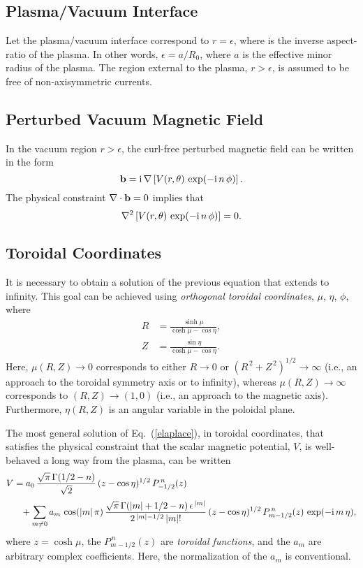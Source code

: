 \documentclass[12pt,prb,aps]{revtex4-1}
\begin{document}
\subsection{Plasma/Vacuum Interface}
Let the plasma/vacuum interface  correspond to $r=\epsilon$, where  is the inverse aspect-ratio of the
plasma. In other words, $\epsilon=a/R_0$, where $a$ is the effective minor radius of the plasma. 
The region external to the plasma, $r>\epsilon$, is assumed to be  free of non-axisymmetric currents.

\subsection{Perturbed Vacuum Magnetic Field}\label{pertb}
In the vacuum region $r>\epsilon$, the curl-free perturbed magnetic field can be written in the form\,\cite{am1}
\begin{equation}\label{vdef}
{\bf b} = {\rm i}\,\nabla\left[ V(r,\theta)\,\exp(-{\rm i}\,n\,\phi)\right].
\end{equation}
The physical constraint $\nabla\cdot {\bf b} =0$ implies that
\begin{equation}\label{elaplace}
\nabla^2 \left[V(r,\theta)\,\exp(-{\rm i}\,n\,\phi)\right]= 0.
\end{equation}

\subsection{Toroidal Coordinates}
It is necessary to obtain a solution of the previous equation that extends to infinity. This goal can be achieved using {\em orthogonal toroidal coordinates}, $\mu$, $\eta$, $\phi$, 
where\,\cite{morse}
\begin{align}\label{e54cx}
R &= \frac{\sinh\mu}{\cosh\mu-\cos\eta},\\[0.5ex]
Z&= \frac{\sin\eta}{\cosh\mu-\cos\eta}.\label{e55cc}
\end{align}
Here, $\mu(R,Z)\rightarrow 0$ corresponds to either $R\rightarrow 0$ or $(R^{\,2}+Z^{\,2})^{1/2}\rightarrow\infty$ (i.e.,
an approach to the toroidal symmetry axis or to infinity), whereas $\mu(R,Z)\rightarrow \infty$
corresponds to $(R, Z) \rightarrow (1, 0)$ (i.e., an approach to the magnetic axis). Furthermore, $\eta(R,Z)$ is an angular variable in the poloidal
plane. 

 The most general solution of Eq.~(\ref{elaplace}), in toroidal coordinates, that satisfies the physical constraint that the scalar magnetic
 potential, $V$,    is well-behaved a long way from the plasma, can be written\,\cite{morse1}
\begin{align}\label{e233}
V &=
 a_0\,\frac{\sqrt{\pi}\,\Gamma(1/2-n)}{\sqrt{2}}\,(z-\cos\eta)^{1/2}\,P_{-1/2}^{\,n}(z) \\[0.5ex]
&\phantom{=}+\sum_{m\neq 0} a_m\,\cos(|m|\,\pi)\,
\frac{\sqrt{\pi}\,\Gamma(|m|+1/2-n)\,\epsilon^{\,|m|}}{2^{\,|m|-1/2}\,|m|!}
\,(z-\cos\eta)^{1/2}\,P_{m-1/2}^{\,n}(z) \,\exp(-{\rm i}\,m\,\eta),\nonumber
\end{align}
where $z=\cosh\mu$, the $P_{m-1/2}^{\,n}(z)$ are {\em toroidal functions},\cite{abrama} and the $a_m$ are arbitrary complex coefficients.
Here, the normalization of the $a_m$ is conventional.\cite{am1}
\end{document}
